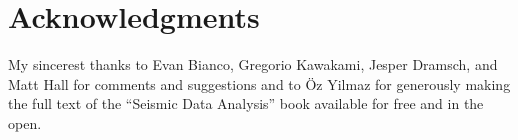 \section{Acknowledgments}

My sincerest thanks to Evan Bianco, Gregorio Kawakami, Jesper Dramsch, and Matt Hall
for comments and suggestions
and to Öz Yilmaz for generously making the full text of the
``Seismic Data Analysis'' book available for free and in the open.
